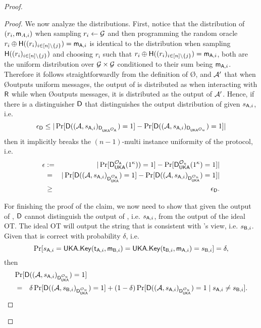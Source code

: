 \begin{proof}
\begin{proof}
We now analyze the distributions. 
First, notice that the distribution of $(r_i,\mathsf{m}_{A,i})$ when sampling $r_i\leftarrow\mathcal{G}$ and then programming the random oracle $r_i\oplus\mathsf{H}((r_i)_{i\in[n]\setminus \{j\}})=\mathsf{m}_{\mathsf{A},i}$ is identical to the distribution when sampling $\mathsf{H}((r_i)_{i\in[n]\setminus \{j\}})$ and choosing $r_i$  such that $r_i\oplus\mathsf{H}((r_i)_{i\in[n]\setminus \{j\}})=\mathsf{m}_{\mathsf{A},i}$, both are the uniform distribution over $\mathcal{G}\times\mathcal{G}$ conditioned to their sum being $\mathsf{m}_{\mathsf{A},i}$. Therefore it follows straightforwardly from the definition of \O, \rec and $\mathcal{A}'$ that when \O outputs uniform messages, the output of \Adv is distributed as when interacting with $\mathsf{R}$ while when \O outputs \UKA messages, it is distributed as the output of $\mathcal{A}'$. Hence, if there is a distinguisher $\mathsf D$ that distinguishes the output distribution of \Adv given $s_{\mathsf{A},i}$, i.e.
$$
\epsilon_{\mathsf D}\leq |\Pr[\mathsf D((\mathcal{A},s_{\mathsf{A},i})_{\mathsf D_{{\mathsf{UKA}}^{\mathcal{O}_\mathsf{A}}}})=1]-\Pr[\mathsf D((\mathcal{A},s_{\mathsf{A},i})_{\mathsf D_{{\mathsf{UKA}}^{\mathcal{O}_u}}})=1]|
$$
then it implicitly breaks the $(n-1)$-multi instance uniformity of the \UKA protocol, i.e. 
\begin{eqnarray*}
\epsilon&:=& |\Pr[\mathsf D_{\mathsf{UKA}}^{\mathcal{O}_{\mathsf{A}}}(1^\kappa))=1] -\Pr[ \mathsf D_{\mathsf{UKA}}^{\mathcal{O}_u}(1^\kappa)=1]|\\
&=&|\Pr[\mathsf D((\mathcal{A},s_{\mathsf{A},i})_{\mathsf D_{\mathsf{UKA}}^{\mathcal{O}_{\mathsf{A}}}})=1] -\Pr[ \mathsf D((\mathcal{A},s_{\mathsf{A},i})_{\mathsf D_{\mathsf{UKA}}^{\mathcal{O}_{u}}})=1]|\\
&\geq & \epsilon_{\mathsf D}.
\end{eqnarray*}

For finishing the proof of the claim, we now need to show that given the output of \Adv, $\mathsf D$ cannot distinguish the output of \rec, i.e. $s_{\mathsf{A},i}$,  from the output of the ideal OT. The ideal OT will output the string that is consistent with \send's view, i.e. $s_{\mathsf{B},i}$.
Given that \UKA is correct with probability $\delta$, i.e. 
$$
\Pr[s_{\mathsf{A},i}=\mathsf{UKA}.\mathsf{Key}(\mathsf{t}_{\mathsf{A},i},\mathsf{m}_{\mathsf{B},i})=\mathsf{UKA}.\mathsf{Key}(\mathsf{t}_{\mathsf{B},i},\mathsf{m}_{\mathsf{A},i})=s_{\mathsf{B},i}]= \delta, 
$$
then
\begin{eqnarray*}
\lefteqn{\Pr[ \D((\Adv,s_{\A,i})_{\D_{\UKA}^{\O_{u}}})=1]}\\
&=&\delta\Pr[ \D((\Adv,s_{\B,i})_{\D_{\UKA}^{\O_{u}}})=1]+(1-\delta)\Pr[ \D((\Adv,s_{\A,i})_{\D_{\UKA}^{\O_{u}}})=1\mid s_{\A,i}\neq s_{\B,i}].
\end{eqnarray*}


\end{proof}
\end{proof}
